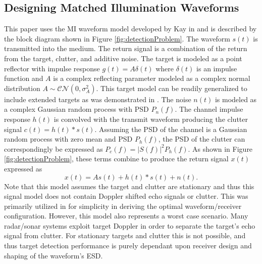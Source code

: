 \documentclass{article}
\begin{document}
\subsection{Designing Matched Illumination Waveforms}
\label{subsec:optimalDetectionProblem}
This paper uses the MI waveform model developed by Kay in \cite{Kay2007} and is described by the block diagram shown in Figure \ref{fig:detectionProblem}.  The waveform $s\left(t\right)$ is transmitted into the medium.  The return signal is a combination of the return from the target, clutter, and additive noise.  The target is modeled as a point reflector with impulse response $g\left(t\right) = A \delta\left(t\right)$ where $\delta \left(t\right)$ is an impulse function and $A$ is a complex reflecting parameter modeled as a complex normal distribution $A\sim \mathcal{CN}\left(0, \sigma_A^2\right)$.  This target model can be readily generalized to include extended targets as was demonstrated in \cite{Romero}.  The noise $n\left(t\right)$ is modeled as a complex Gaussian random process with PSD $P_n\left(f\right)$.  The channel impulse response $h\left(t\right)$ is convolved with the transmit waveform producing the clutter signal $c\left(t\right) = h\left(t\right)*s\left(t\right)$.  Assuming the PSD of the channel is a Gaussian random process with zero mean and PSD $P_h\left(f\right)$, the PSD of the clutter can correspondingly be expressed as $P_c\left(f\right) = |S\left(f\right)|^2P_h\left(f\right)$.  As shown in Figure \ref{fig:detectionProblem}, these terms combine to produce the return signal $x\left(t\right)$ expressed as
\begin{equation}
x\left(t\right) = As\left(t\right) + h\left(t\right)*s\left(t\right) + n\left(t\right).
\end{equation}
Note that this model assumes the target and clutter are stationary and thus this signal model does not contain Doppler shifted echo signals or clutter.  This was primarily utilized in \cite{Kay2007} for simplicity in deriving the optimal waveform/receiver configuration.  However, this model also represents a worst case scenario.  Many radar/sonar systems exploit target Doppler in order to separate the target's echo signal from clutter.  For stationary targets and clutter this is not possible, and thus target detection performance is purely dependant upon receiver design and shaping of the waveform's ESD.
\end{document}
